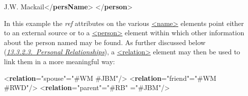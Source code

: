 \begin{shaded}
J.W. Mackail{</\textbf{persName}>}\mbox{}\newline 
{</\textbf{person}>}\end{shaded}\egroup\par \noindent  In this example the {\itshape ref} attributes on the various \hyperref[TEI.name]{<name>} elements point either to an external source or to a \hyperref[TEI.person]{<person>} element within which other information about the person named may be found. As further discussed below (\textit{\hyperref[NDPERSREL]{13.3.2.3.\ Personal Relationships}}), a \hyperref[TEI.relation]{<relation>} element may then be used to link them in a more meaningful way: \par\bgroup{}\exampleFont \begin{shaded}\noindent\mbox{}{<\textbf{relation}\hspace*{1em}{name}="{spouse}"\hspace*{1em}{mutual}="{\#WM \#JBM}"/>}\mbox{}\newline 
{<\textbf{relation}\hspace*{1em}{name}="{friend}"\hspace*{1em}{mutual}="{\#WM \#RWD}"/>}\mbox{}\newline 
{<\textbf{relation}\hspace*{1em}{name}="{parent}"\hspace*{1em}{active}="{\#RB}"\mbox{}\newline 
\hspace*{1em}{passive}="{\#JBM}"/>}\end{shaded}\egroup\par \par
